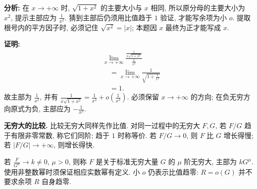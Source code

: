 \documentclass[UTF8,openany]{ctexbook}
\theoremstyle{chinesetextbook}
\newenvironment{cnproof}{\par\indent\textbf{证明:} \ignorespaces}{\par}
\begin{document}
\par\indent\textbf{分析:} 在 $x\to+\infty$ 时, $\sqrt{1+x^2}$ 的主要大小与 $x$ 相同, 所以原分母的主要大小为 $x^2$, 提示主部应为 $\displaystyle\frac1{x^2}$. 猜到主部后仍须用比值趋于 $1$ 验证, 才能写余项为小 $o$. 提取根号内的平方因子时, 必须记住 $\sqrt{x^2}=|x|$; 本题因 $x$ 最终为正才能写成 $x$.
\begin{cnproof}
\[
\begin{aligned}
&\lim_{x\to+\infty}\frac{\frac1{x\sqrt{1+x^2}}}{\frac1{x^2}}\\
&\quad=\lim_{x\to+\infty}\frac1{\sqrt{1+\frac1{x^2}}}\\
&\quad=1.
\end{aligned}
\]
故主部为 $\displaystyle \frac1{x^2}$, 并有 $\displaystyle \frac1{x\sqrt{1+x^2}}=\frac1{x^2}+o(\frac1{x^2})$. 必须保留 $x\to+\infty$ 的方向; 在负无穷方向原式为负, 主部应为 $\displaystyle -\frac1{x^2}$.
\end{cnproof}
\par\indent\textbf{无穷大的比较.} 比较无穷大同样先作比值. 对同一过程中的无穷大 $F,G$, 若 $F/G$ 趋于有限非零常数, 称它们同阶; 趋于 $1$ 时称等价. 若 $F/G\to0$, 则 $F$ 比 $G$ 增长得慢; 若 $|F/G|\to+\infty$, 则增长得快.

若 $\displaystyle\frac F{G^\mu}\to k\ne0$, $\mu>0$, 则称 $F$ 是关于标准无穷大量 $G$ 的 $\mu$ 阶无穷大, 主部为 $kG^\mu$. 使用非整数幂时须保证相应实数幂有定义. 小 $o$ 仍表示比值趋零: $R=o(G)$ 并不要求余项 $R$ 自身趋零.
\end{document}
